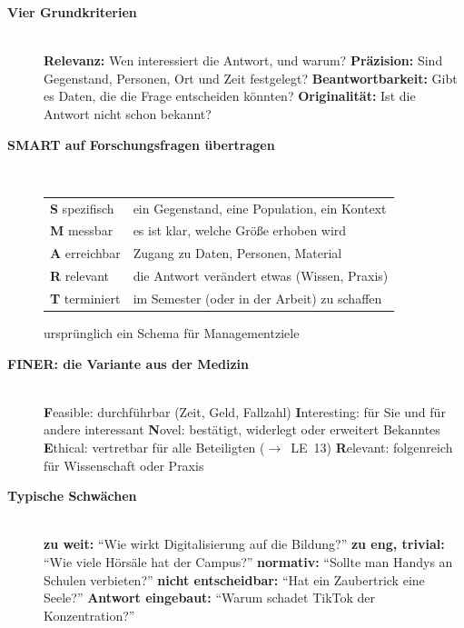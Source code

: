 \begin{description}
\item[{\rot\bf Vier Grundkriterien}]~\\[-\lblskip]
\bi
  \ite \textbf{Relevanz:} Wen interessiert die Antwort, und warum?
  \ite \textbf{Präzision:} Sind Gegenstand, Personen, Ort und Zeit
    festgelegt?
  \ite \textbf{Beantwortbarkeit:} Gibt es Daten, die die Frage entscheiden
    könnten?
  \ite \textbf{Originalität:} Ist die Antwort nicht schon bekannt?
\ei
\os{\newpage}

\item[{\rot\bf SMART auf Forschungsfragen übertragen}]~\\[-\lblskip]
\begin{center}
\small
\begin{tabular}{lp{}}
\toprule
\textbf{S} spezifisch & ein Gegenstand, eine Population, ein Kontext \\
\textbf{M} messbar & es ist klar, welche Größe erhoben wird \\
\textbf{A} erreichbar & Zugang zu Daten, Personen, Material \\
\textbf{R} relevant & die Antwort verändert etwas (Wissen, Praxis) \\
\textbf{T} terminiert & im Semester (oder in der Arbeit) zu schaffen \\
\bottomrule
\end{tabular}
\end{center}
\bi
  \ite ursprünglich ein Schema für Managementziele \parencite{doran1981smart}
\ei
\os{\newpage}

\item[{\rot\bf FINER: die Variante aus der Medizin}]~\\[-\lblskip]
\bi
  \ite \textbf{F}easible: durchführbar (Zeit, Geld, Fallzahl)
  \ite \textbf{I}nteresting: für Sie und für andere interessant
  \ite \textbf{N}ovel: bestätigt, widerlegt oder erweitert Bekanntes
  \ite \textbf{E}thical: vertretbar für alle Beteiligten ($\to$~LE~13)
  \ite \textbf{R}elevant: folgenreich für Wissenschaft oder Praxis
    \parencite{hulley2013designing}
\ei
\os{\newpage}

\item[{\rot\bf Typische Schwächen}]~\\[-\lblskip]
\bi
  \ite \textbf{zu weit:} \enquote{Wie wirkt Digitalisierung auf die
    Bildung?}
  \ite \textbf{zu eng, trivial:} \enquote{Wie viele Hörsäle hat der
    Campus?}
  \ite \textbf{normativ:} \enquote{Sollte man Handys an Schulen verbieten?}
  \ite \textbf{nicht entscheidbar:} \enquote{Hat ein Zaubertrick eine
    Seele?}
  \ite \textbf{Antwort eingebaut:} \enquote{Warum schadet TikTok der
    Konzentration?}
\ei
{}
\os{\newpage}
\end{description}

